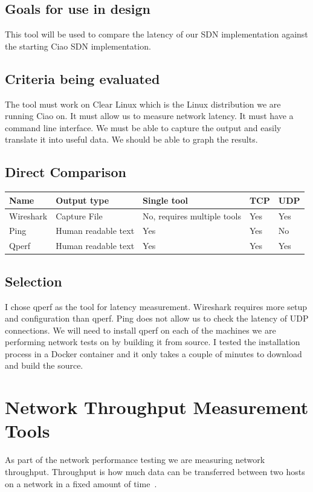 \documentclass[10pt,letterpaper,onecolumn,journal]{IEEEtran}
\begin{document}
\subsection{Goals for use in design}
This tool will be used to compare the latency of our SDN implementation against the starting Ciao SDN implementation.

\subsection{Criteria being evaluated}
The tool must work on Clear Linux which is the Linux distribution we are running Ciao on.
It must allow us to measure network latency. 
It must have a command line interface.
We must be able to capture the output and easily translate it into useful data. 
We should be able to graph the results. 


\subsection{Direct Comparison}

\begin{center}
	\begin{tabular}{| l | l | l | l | l |}
		\hline
		Name & Output type & Single tool & TCP & UDP \\ \hline
		Wireshark & Capture File & No, requires multiple tools & Yes & Yes \\ \hline
		Ping & Human readable text & Yes & Yes & No \\ \hline
		Qperf & Human readable text & Yes & Yes & Yes \\ \hline
	\end{tabular}
\end{center}

\subsection{Selection}
I chose qperf as the tool for latency measurement.
Wireshark requires more setup and configuration than qperf.
Ping does not allow us to check the latency of UDP connections.
We will need to install qperf on each of the machines we are performing network tests on by building it from source.
I tested the installation process in a Docker container and it only takes a couple of minutes to download and build the source.

\section{Network Throughput Measurement Tools}
As part of the network performance testing we are measuring network throughput.
Throughput is how much data can be transferred between two hosts on a network in a fixed amount of time~\cite{topdown-ssl}.
\end{document}

